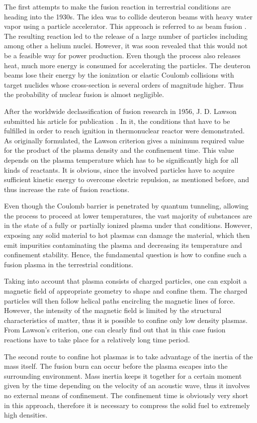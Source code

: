 The first attempts to make the fusion reaction in terrestrial conditions are heading into the 1930s. The idea was to collide deuteron beams with heavy water vapor using a particle accelerator. This approach is referred to as beam fusion \cite{oliphant}. The resulting reaction led to the release of a large number of particles including among other a helium nuclei. However, it was soon revealed that this would not be a feasible way for power production. Even though the process also releases heat, much more energy is consumed for accelerating the particles. The deuteron beams lose their energy by the ionization or elastic Coulomb collisions with target nuclides whose cross-section is several orders of magnitude higher. Thus the probability of nuclear fusion is almost negligible.

After the worldwide declassification of fusion research in 1956, J. D. Lawson submitted his article for publication \cite{lawson}. In it, the conditions that have to be fulfilled in order to reach ignition in thermonuclear reactor were demonstrated. As originally formulated, the Lawson criterion gives a minimum required value for the product of the plasma density and the confinement time. This value depends on the plasma temperature which has to be significantly high for all kinds of reactants. It is obvious, since the involved particles have to acquire sufficient kinetic energy to overcome electric repulsion, as mentioned before, and thus increase the rate of fusion reactions.

Even though the Coulomb barrier is penetrated by quantum tunneling, allowing the process to proceed at lower temperatures, the vast majority of substances are in the state of a fully or partially ionized plasma under that conditions. However, exposing any solid material to hot plasmas can damage the material, which then emit impurities contaminating the plasma and decreasing its temperature and confinement stability. Hence, the fundamental question is how to confine such a fusion plasma in the terrestrial conditions.

Taking into account that plasma consists of charged particles, one can exploit a magnetic field of appropriate geometry to shape and confine them. The charged particles will then follow helical paths encircling the magnetic lines of force. However, the intensity of the magnetic field is limited by the structural characteristics of matter, thus it is possible to confine only low density plasmas. From Lawson's criterion, one can clearly find out that in this case fusion reactions have to take place for a relatively long time period.

The second route to confine hot plasmas is to take advantage of the inertia of the mass itself. The fusion burn can occur before the plasma escapes into the surrounding environment. Mass inertia keeps it together for a certain moment given by the time depending on the velocity of an acoustic wave, thus it involves no external means of confinement. The confinement time is obviously very short in this approach, therefore it is necessary to compress the solid fuel to extremely high densities.